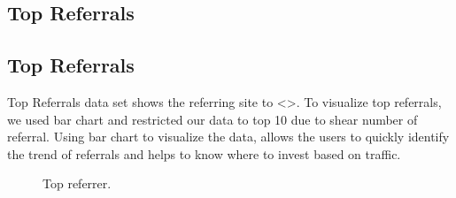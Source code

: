 \subsection{Top Referrals} \label{viztoprefs}
\subsection{Top Referrals} \label{viztoprefs}
Top Referrals data set shows the referring site to <>. To visualize
top referrals, we used bar chart and restricted our data to top 10 due
to shear number of referral. Using bar chart to visualize the data,
allows the users to quickly identify the trend of referrals and helps
to know where to invest based on traffic. 

\begin{figure}
\centering
{}
\caption{Top referrer.}
\label{fig:topreferrer}
\end{figure}


